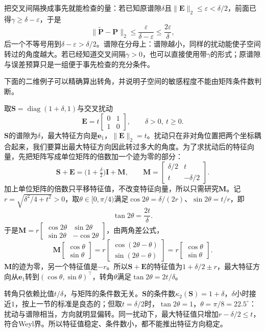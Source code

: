 把交叉间隔换成事先就能检查的量：若已知原谱隙$\delta$且$\lVert\bm E\rVert_2\leq\varepsilon<\delta/2$，前面已得$\gamma\geq\delta-\varepsilon$，于是
\[
 \lVert\widetilde{\bm P}-\bm P\rVert_2\leq\frac{\varepsilon}{\delta-\varepsilon}\leq\frac{2\varepsilon}{\delta},
\]
后一个不等号用到$\delta-\varepsilon>\delta/2$。谱隙在分母上：谱隙越小，同样的扰动能使子空间转过的角度越大。若已经知道交叉间隔$\gamma>0$，也可以直接使用带$\gamma$的形式；原谱隙与误差预算只是一组便于事先检查的充分条件。

下面的二维例子可以精确算出转角，并说明子空间的敏感程度不能由矩阵条件数判断。
\begin{example}[谱隙与特征方向的转角]
\label{ex:ls-gap-direction-rotation}
取$\bm S=\operatorname{diag}(1+\delta,1)$与交叉扰动
\[
 \bm E=t\begin{bmatrix}0&1\\1&0\end{bmatrix},\qquad\delta>0,\ t\geq0 .
\]
$\bm S$的谱隙为$\delta$，最大特征方向是$\bm e_1$，$\lVert\bm E\rVert_2=t$。扰动只在非对角位置把两个坐标耦合起来，我们要算出最大特征方向因此转过多大的角度。为了求扰动后的特征向量，先把矩阵写成单位矩阵的倍数加一个迹为零的部分：
\[
 \bm S+\bm E=\bigl(1+\tfrac\delta2\bigr)\bm I+\bm M,\qquad
 \bm M=\begin{bmatrix}\delta/2&t\\t&-\delta/2\end{bmatrix}.
\]
加上单位矩阵的倍数只平移特征值，不改变特征向量，所以只需研究$\bm M$。记$r=\sqrt{\delta^2/4+t^2}>0$，取$\theta\in[0,\pi/4)$满足$\cos2\theta=\delta/(2r)$、$\sin2\theta=t/r$，即
\[
 \tan2\theta=\frac{2t}{\delta}.
\]
于是$\bm M=r\left[\begin{smallmatrix}\cos2\theta&\sin2\theta\\\sin2\theta&-\cos2\theta\end{smallmatrix}\right]$，由两角差公式，
\[
 \bm M\begin{bmatrix}\cos\theta\\\sin\theta\end{bmatrix}
 =r\begin{bmatrix}\cos(2\theta-\theta)\\\sin(2\theta-\theta)\end{bmatrix}
 =r\begin{bmatrix}\cos\theta\\\sin\theta\end{bmatrix}.
\]
$\bm M$的迹为零，另一个特征值是$-r$。所以$\bm S+\bm E$的特征值为$1+\delta/2\pm r$，最大特征方向从$\bm e_1$转到$(\cos\theta,\sin\theta)^\top$，转角$\theta$满足$\tan2\theta=2t/\delta$。

转角只依赖比值$t/\delta$，与矩阵的条件数无关。$\bm S$的条件数$\kappa_2(\bm S)=1+\delta$，$\delta$小时接近$1$，按上一节的标准是良态的；但取$t=\delta/2$时，$\tan2\theta=1$，$\theta=\pi/8=22.5^\circ$：扰动与谱隙相当，方向就明显偏转。同一扰动下，最大特征值只增加$r-\delta/2\leq t$，符合Weyl界。所以特征值稳定、条件数小，都不能推出特征方向稳定。
\end{example}
